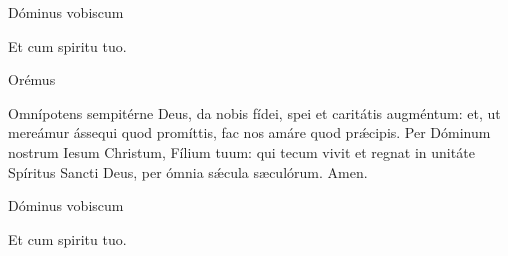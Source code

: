 


\rubric{\Vbar} Dóminus vobiscum

\rubric{\Rbar} Et cum spiritu tuo.

Orémus

Omnípotens sempitérne Deus, da nobis fídei, spei et caritátis augméntum: et, ut mereámur ássequi quod promíttis, fac nos amáre quod prǽcipis. Per Dóminum nostrum Iesum Christum, Fílium tuum: qui tecum vivit et regnat in unitáte Spíritus Sancti Deus, per ómnia sǽcula sæculórum. \rubric{\Rbar} Amen.

\rubric{\Vbar} Dóminus vobiscum

\rubric{\Rbar} Et cum spiritu tuo.
